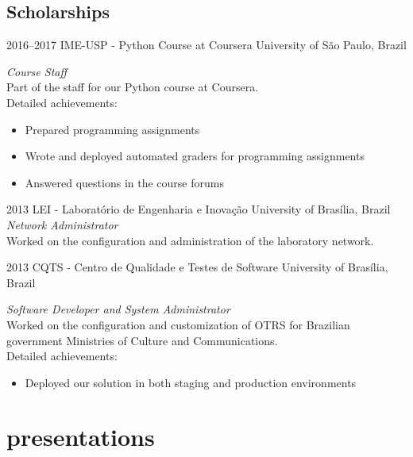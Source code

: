 \documentclass[]{friggeri-cv} %
\begin{document}
\subsection{Scholarships}

\begin{entrylist}

\entry
{2016--2017}
{IME-USP - Python Course at Coursera}
{University of São Paulo, Brazil}
{\emph{Course Staff} \\
Part of the staff for our Python course at Coursera. \\
Detailed achievements:
\begin{itemize}
  \item Prepared programming assignments
  \item Wrote and deployed automated graders for programming assignments
  \item Answered questions in the course forums
\end{itemize}}

\entry
{2013}
{LEI - Laboratório de Engenharia e Inovação}
{University of Brasília, Brazil}
{\emph{Network Administrator} \\
  Worked on the configuration and administration of the laboratory network. \\
}


\entry
{2013}
{CQTS - Centro de Qualidade e Testes de Software}
{University of Brasília, Brazil}
{\emph{Software Developer and System Administrator} \\
  Worked on the configuration and customization of OTRS for Brazilian
  government Ministries of Culture and Communications. \\
Detailed achievements:
\begin{itemize}
  \item Deployed our solution in both staging and production environments
\end{itemize}}

\end{entrylist}

\section{presentations}
\end{document}
